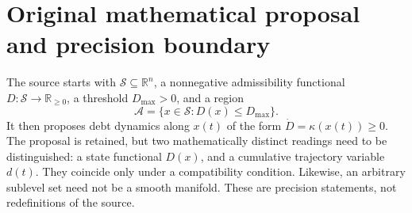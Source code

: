 \documentclass[11pt,letterpaper]{article}
\theoremstyle{definition}\newtheorem{definition}[theorem]{Definition}\newtheorem{example}[theorem]{Example}
\theoremstyle{remark}\newtheorem{remark}[theorem]{Remark}
\newcommand{\R}{\mathbb R}\newcommand{\dd}{\mathrm d}\newcommand{\ess}{\operatorname{ess}}
\begin{document}
\section{Original mathematical proposal and precision boundary}
The source starts with $\mathcal S\subseteq\R^n$, a nonnegative admissibility functional $D:\mathcal S\to\R_{\geq0}$, a threshold $D_{\max}>0$, and a region
\begin{equation}\label{eq:state-A}
\mathcal A=\{x\in\mathcal S:D(x)\leq D_{\max}\}.
\end{equation}
It then proposes debt dynamics along $x(t)$ of the form $\dot D=\kappa(x(t))\geq0$. The proposal is retained, but two mathematically distinct readings need to be distinguished: a state functional $D(x)$, and a cumulative trajectory variable $d(t)$. They coincide only under a compatibility condition. Likewise, an arbitrary sublevel set need not be a smooth manifold. These are precision statements, not redefinitions of the source.
\end{document}
